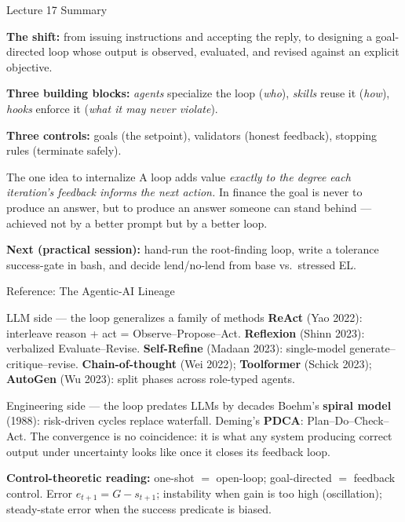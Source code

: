 \documentclass[9pt,t]{beamer}
\begin{document}
\begin{frame}{Lecture 17 Summary}

\textbf{The shift:} from issuing instructions and accepting the reply, to
\alert{designing a goal-directed loop} whose output is observed, evaluated, and
revised against an explicit objective.

\medskip
\textbf{Three building blocks:} \emph{agents} specialize the loop (\emph{who}),
\emph{skills} reuse it (\emph{how}), \emph{hooks} enforce it (\emph{what it may
never violate}).

\medskip
\textbf{Three controls:} goals (the setpoint), validators (honest feedback),
stopping rules (terminate safely).

\medskip
\begin{alertblock}{The one idea to internalize}
A loop adds value \emph{exactly to the degree each iteration's feedback informs
the next action.} In finance the goal is never to produce an answer, but to
produce an answer someone can stand behind --- achieved not by a better prompt
but by a \alert{better loop}.
\end{alertblock}

\medskip
\textbf{Next (practical session):} hand-run the root-finding loop, write a
tolerance success-gate in bash, and decide lend/no-lend from base vs.\ stressed EL.
\end{frame}


\begin{frame}[noframenumbering]{Reference: The Agentic-AI Lineage}

\begin{block}{LLM side --- the loop generalizes a family of methods}
\textbf{ReAct} (Yao 2022): interleave reason + act = Observe--Propose--Act.
\textbf{Reflexion} (Shinn 2023): verbalized Evaluate--Revise.
\textbf{Self-Refine} (Madaan 2023): single-model generate--critique--revise.
\textbf{Chain-of-thought} (Wei 2022); \textbf{Toolformer} (Schick 2023);
\textbf{AutoGen} (Wu 2023): split phases across role-typed agents.
\end{block}

\begin{block}{Engineering side --- the loop predates LLMs by decades}
Boehm's \textbf{spiral model} (1988): risk-driven cycles replace waterfall.
Deming's \textbf{PDCA}: Plan--Do--Check--Act. The convergence is no coincidence:
it is what any system producing correct output under uncertainty looks like once
it closes its feedback loop.
\end{block}

\medskip
\footnotesize\textbf{Control-theoretic reading:} one-shot $=$ open-loop;
goal-directed $=$ feedback control. Error $e_{t+1}=G-s_{t+1}$; instability when
gain is too high (oscillation); steady-state error when the success predicate is
biased.
\end{frame}
\end{document}

